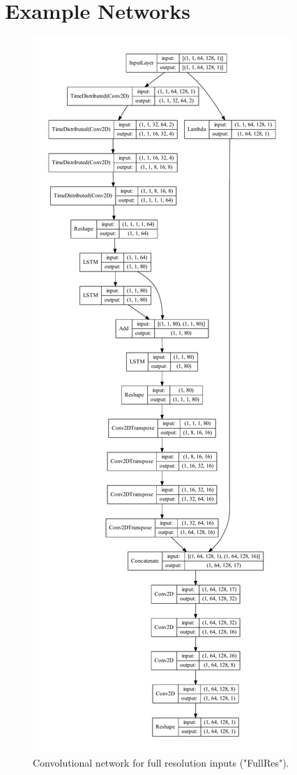 \documentclass[sigconf]{acmart}
\begin{document}
\section{Example Networks}
\begin{figure}
	\includegraphics[height=\textheight]{imgs/model_full.pdf}
	\caption{Convolutional network for full resolution inputs ("FullRes").}
	\label{fullNet}
\end{figure}
\end{document}
